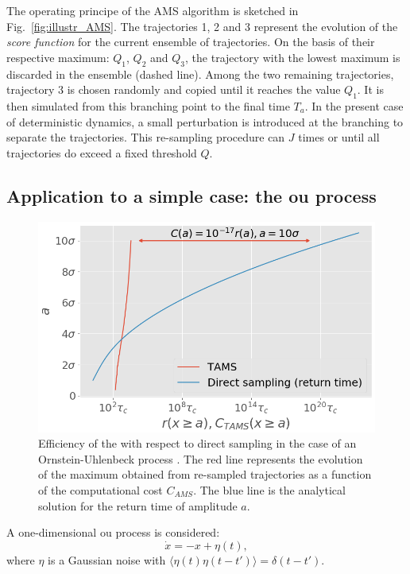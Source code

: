 \documentclass{jfm}
\newcommand{\EL}[1]{{\color{myred}{#1}}}
\begin{document}
The operating principe of the AMS algorithm is sketched in Fig.~\ref{fig:illustr_AMS}.
%
The trajectories 1, 2 and 3 represent the evolution of the \emph{score function} for the current ensemble of trajectories. On the basis of their respective maximum: $Q_1$, $Q_2$ and $Q_3$, the trajectory with the lowest maximum is discarded in the ensemble (dashed line). Among the two remaining trajectories, trajectory 3 is chosen randomly and copied until it reaches the value $Q_1$. It is then simulated from this branching point to the final time $T_a$. In the present case of deterministic dynamics, a small perturbation is introduced at the branching to separate the trajectories. This re-sampling procedure can \EL{be iterated} $J$ times or until all trajectories do exceed a fixed threshold $Q$.

\subsection{Application to a simple case: the \acl{ou} process}
	
	\begin{figure}
		\centering
		\includegraphics[width=.7\linewidth]{AMS_OU/AMS_OU.png}
		\caption{Efficiency of the \EL{\ac{ams} algorithm} with respect to direct sampling in the case of an Ornstein-Uhlenbeck process \citep{lestang_computing_2018}. The red line represents the evolution of the maximum obtained from re-sampled trajectories as a function of the computational cost $C_{AMS}$. The blue line is the analytical solution for the return time of amplitude $a$.}
		\label{fig:comparaison_temps_de_retour}
	\end{figure}
	A one-dimensional \acl{ou} process is considered:
	\begin{equation}
	\label{eq:ou}
	\dot{x} = -x + \eta (t),
	\end{equation}
	where $\eta$ is a Gaussian noise with $\langle \eta(t)\eta(t-t')\rangle = \delta(t-t')$.
	
\end{document}

